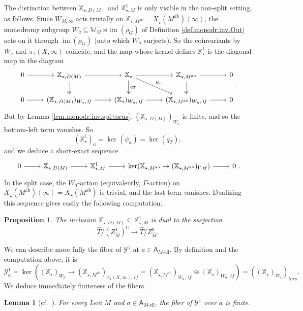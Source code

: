 \documentclass[openany]{amsbook}
\newtheorem{lemma}[theorem]{Lemma}
\newtheorem{proposition}[theorem]{Proposition}
\theoremstyle{definition}
\theoremstyle{remark}
\numberwithin{equation}{section}
\newcommand{\W}{\mathbb{W}}
\newcommand{\cY}{\mathcal{Y}}
\newcommand{\im}{\operatorname{im}}
\newcommand{\ul}[1]{\underline{#1}}
\renewcommand{\-}{\operatorname{-}}
\newcommand{\el}{\text{-ell}}
\newcommand{\bA}{\mathsf{A}}
\newcommand{\bX}{\mathbb{X}}
\newcommand{\bAe}[1]{\bA_{#1\el}}
\newcommand{\tors}{\mathit{tors}}
\newcommand{\tf}{\mathit{tf}}
\newcommand{\ab}{\mathrm{ab}}
\begin{document}
The distinction between $\bX_{\star, D(M)}$ and $\bX^1_{\star,M}$ is only visible in the non-split setting, as follows. Since $W_{M,\infty}$ acts trivially on $\bX_{\star, M^{\ab}} = \ul{X}_\star(M^{\ab})(\infty)$, 
the monodromy subgroup $W_a \subseteq \W_M \rtimes \im(\rho_G)$ of Definition \ref{def.monodr.inv.Out} acts on it through $\im(\rho_G)$ (onto which $W_a$ surjects). So the coinvariants by $W_a$ and $\pi_1(X, \infty)$ coincide, and the map whose kernel defines $\bX_\star^1$ is the diagonal map in the diagram
$$
\begin{tikzcd}[ampersand replacement=\&]
    0 \ar[r] \& \bX_{\star, D(M)} \ar[r] \ar[d, two heads] \& \bX_{\star} \ar[r] \ar[d, two heads, "q_T"] \ar[dr, "\psi_a"] \& \bX_{\star, M^{\ab}} \ar[r] \ar[d, two heads] \& 0 \\
     0 \ar[r] \& (\bX_{\star, D(M)})_{W_a, \, \tf} \ar[r] \& (\bX_{\star})_{W_a, \, \tf} \ar[r] \& (\bX_{\star, M^{\ab}})_{W_a, \, \tf} \ar[r] \& 0
\end{tikzcd}.
$$
But by Lemma \ref{lem.monodr.inv.spl.torus}, $(\bX_{\star, D(M)})_{W_a}$ is finite, and so the bottom-left term vanishes. So
$$
    (\bX_{\star}^1)_a = \ker(\psi_a) = \ker(q_T),
$$
and we deduce a short-exact sequence
$$
    \begin{tikzcd}[ampersand replacement=\&]
        0 \ar[r] \& \bX_{\star,D(M)} \ar[r] \& \bX_{\star, M}^1 \ar[r] \& \ker(\bX_{\star, M^{\ab}} \to (\bX_{\star, M^{\ab}})_{\Gamma, \tf}) \ar[r] \& 0
    \end{tikzcd}.
$$
In the split case, the $W_a$-action (equivalently, $\Gamma$-action) on $\ul{X}_\star(M^{\ab})(\infty) = X_\star(M^{\ab})$ is trivial, and the last term vanishes. Dualizing this sequence gives easily the following computation.

\begin{proposition}
    The inclusion $\bX_{\star, D(M)} \subseteq \bX_{\star,M}^1$ is dual to the surjection
    $$
        \widehat{T}/(Z_{\widehat{M}}^\Gamma)^0 \to \widehat{T}/Z_{\widehat{M}}^0.
    $$
\end{proposition}

We can describe more fully the fiber of $\cY^1$ at $a \in \bAe{M}$. By definition and the computation above, it is
$$
    \cY^1_a = \ker((\bX_\star)_{W_a} \to (\bX_{\star, M^{\ab}})_{\pi_1(X, \infty), \,\tf} = (\bX_{\star, M^{\ab}})_{W_a, \,\tf} \cong (\bX_{\star})_{W_a, \, \tf}) = ((\bX_\star)_{W_a})_{\tors}.
$$
We deduce immediately finiteness of the fibers.
\begin{lemma}[{{cf.\ \cite[Lemme 8.3.3]{CLI}}}]\label{lem.coinv.finite}
    For every Levi $M$ and $a \in \bAe{M}$, the fiber of $\cY^1$ over $a$ is finite.
\end{lemma}
\end{document}

